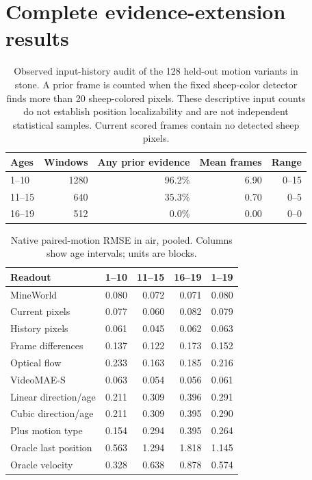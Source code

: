 \section{Complete evidence-extension results}
\label{app:extension-results}
\begin{table}[!htbp]
\centering\small
\caption{Observed input-history audit of the 128 held-out motion variants in stone. A prior frame is counted when the fixed sheep-color detector finds more than 20 sheep-colored pixels. These descriptive input counts do not establish position localizability and are not independent statistical samples. Current scored frames contain no detected sheep pixels.}
\label{tab:motion-history-audit}
\begin{tabular}{@{}lrrrr@{}}
\toprule
Ages & Windows & Any prior evidence & Mean frames & Range\\
\midrule
1--10 & 1280 & 96.2\% & 6.90 & 0--15\\
11--15 & 640 & 35.3\% & 0.70 & 0--5\\
16--19 & 512 & 0.0\% & 0.00 & 0--0\\
\bottomrule
\end{tabular}
\end{table}

\begin{table}[!htbp]
\centering\small
\caption{Native paired-motion RMSE in air, pooled. Columns show age intervals; units are blocks.}
\label{tab:motion-L0-pooled}
\begin{tabular}{@{}lrrrr@{}}
\toprule
Readout & 1--10 & 11--15 & 16--19 & 1--19\\
\midrule
MineWorld & 0.080 & 0.072 & 0.071 & 0.080\\
Current pixels & 0.077 & 0.060 & 0.082 & 0.079\\
History pixels & 0.061 & 0.045 & 0.062 & 0.063\\
Frame differences & 0.137 & 0.122 & 0.173 & 0.152\\
Optical flow & 0.233 & 0.163 & 0.185 & 0.216\\
VideoMAE-S & 0.063 & 0.054 & 0.056 & 0.061\\
Linear direction/age & 0.211 & 0.309 & 0.396 & 0.291\\
Cubic direction/age & 0.211 & 0.309 & 0.395 & 0.290\\
Plus motion type & 0.154 & 0.294 & 0.395 & 0.264\\
Oracle last position & 0.563 & 1.294 & 1.818 & 1.145\\
Oracle velocity & 0.328 & 0.638 & 0.878 & 0.574\\
\bottomrule
\end{tabular}
\end{table}

